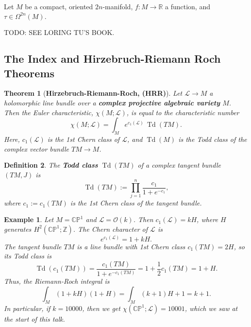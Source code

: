 \documentclass{article}
\newtheorem{theorem}{Theorem}[section]
\newtheorem{defn}[theorem]{Definition\rm}
\newtheorem{example}{Example}
\newcommand{\ra}{\rightarrow}
\newcommand{\W}{\Omega}
\newcommand{\PP}{\mathbb{P}}
\newcommand{\RR}{\mathbb{R}}
\newcommand{\CC}{\mathbb{C}}
\newcommand{\ZZ}{\mathbb{Z}}
\newcommand{\mcL}{\mathcal{L}}
\newcommand{\mcO}{\mathcal{O}}
\DeclareMathOperator{\Td}{Td}
\begin{document}
Let $M$ be a compact, oriented $2n$-manifold, $f : M \ra \RR$ a function, and $\tau \in \W^{2n}(M)$.

TODO: SEE LORING TU'S BOOK.

\subsection{The Index and Hirzebruch-Riemann Roch Theorems}

\begin{theorem}[\textbf{Hirzebruch-Riemann-Roch, (HRR)}]
	Let $\mcL \ra M$ a holomorphic line bundle over a \textbf{complex projective algebraic variety} $M$. Then the Euler characteristic, $\chi(M; \mcL)$, is equal to the characteristic number
	\begin{equation*}
		\chi(M; \mcL) =	\int_{M} e^{c_{1}(\mcL)}\, \Td(TM).
	\end{equation*}
	Here, $c_{1}(\mcL)$ is the \emph{1st Chern class} of $\mcL$, and $\Td(M)$ is the \emph{Todd class} of the complex vector bundle $TM \ra M$.
\end{theorem}

\begin{defn}
	The \textbf{Todd class} $\Td(TM)$ of a complex tangent bundle $(TM, J)$ is
	\begin{equation*}
		\Td(TM) := \prod_{j = 1}^{n} \frac{c_{1}}{1 + e^{-c_{1}}},
	\end{equation*}
	where $c_{1} := c_{1}(TM)$ is the 1st Chern class of the tangent bundle.
\end{defn}

\begin{example}
	Let $M = \CC\PP^{1}$ and $\mcL = \mcO(k)$. Then $c_{1}(\mcL) = kH$, where $H$ generates $H^{2}(\CC\PP^{1}; \ZZ)$. The Chern character of $\mcL$ is
	\begin{equation*}
		e^{c_{1}(\mcL)} = 1 + kH.
	\end{equation*}
	The tangent bundle $TM$ is a line bundle with 1st Chern class $c_{1}(TM) = 2H$, so its Todd class is
	\begin{equation*}
		\Td(c_{1}(TM)) = \frac{c_{1}(TM)}{1 + e^{-c_{1}(TM)}} = 1 + \frac{1}{2}c_{1}(TM) = 1 + H.
	\end{equation*}
	Thus, the Riemann-Roch integral is
	\begin{equation*}
		\int_{M} (1 + kH)(1 + H) = \int_{M} (k+1)H + 1 = k+1.
	\end{equation*}
	In particular, if $k = 10000$, then we get $\chi(\CC\PP^{1}; \mcL) = 10001$, which we saw at the start of this talk.
\end{example}
\end{document}

